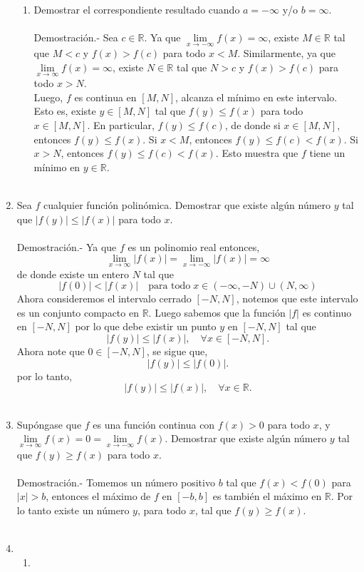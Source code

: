 \begin{enumerate}
\begin{enumerate}[\bfseries (a)]
	\item Demostrar el correspondiente resultado cuando $a=-\infty$ y/o $b=\infty$.\\\\
	    Demostración.-\; Sea $c\in \mathbb{R}$. Ya que $\lim\limits_{x\to -\infty}f(x) = \infty$, existe $M\in \mathbb{R}$ tal que $M<c$ y $f(x)>f(c)$ para todo $x<M.$ Similarmente, ya que $\lim\limits_{x\to \infty} f(x)=\infty$, existe $N\in \mathbb{R}$ tal que $N>c$ y $f(x)>f(c)$ para todo $x>N$.\\
	    Luego, $f$ es continua en $[M,N]$, alcanza el mínimo en este intervalo. Esto es, existe $y\in [M,N]$ tal que $f(y)\leq f(x)$ para todo $x\in [M,N]$. En particular, $f(y)\leq f(c)$, de donde si $x\in [M,N]$, entonces $f(y)\leq f(x).$ Si $x<M$, entonces $f(y)\leq f(c)<f(x).$ Si $x>N$, entonces $f(y)\leq f(c)<f(x).$ Esto muestra que $f$ tiene un mínimo en $y \in \mathbb{R}.$\\\\

    \end{enumerate}

\item Sea $f$ cualquier función polinómica. Demostrar que existe algún número $y$ tal que $|f(y)|\leq |f(x)|$ para todo $x$.\\\\
    Demostración.-\; Ya que $f$ es un polinomio real entonces,
    $$\lim_{x\to \infty} |f(x)|=\lim_{x\to -\infty}|f(x)|=\infty$$
    de donde existe un entero $N$ tal que 
    $$|f(0)|<|f(x)|\quad \mbox{para todo}\; x\in (-\infty,-N)\cup(N,\infty)$$
    Ahora consideremos el intervalo cerrado $[-N,N]$, notemos que este intervalo es un conjunto compacto en $\mathbb{R}$. Luego sabemos que la función $|f|$ es continuo en $[-N,N]$ por lo que debe existir un punto $y$ en $[-N,N]$ tal que 
    $$|f(y)|\leq |f(x)|,\quad \forall x\in [-N,N].$$
    Ahora note que $0 \in [-N,N]$, se sigue que,
    $$|f(y)|\leq |f(0)|.$$
    por lo tanto,
    $$|f(y)|\leq |f(x)|,\quad \forall x\in \mathbb{R}.$$\\

\item Supóngase que $f$ es una función continua con $f(x)>0$ para todo $x$, y $\lim\limits_{x\to \infty} f(x)=0 = \lim\limits_{x\to -\infty} f(x)$. Demostrar que existe algún número $y$ tal que $f(y)\geq f(x)$ para todo $x$.\\\\
    Demostración.-\; Tomemos un número positivo $b$ tal que $f(x)<f(0)$ para $|x|>b$, entonces el máximo de $f$ en $[-b,b]$ es también el máximo en $\mathbb{R}.$ Por lo tanto existe un número $y$, para todo $x$, tal que $f(y)\geq f(x).$\\\\

\item 
    \begin{enumerate}[\bfseries (a)]
	\item 
    \end{enumerate}
    

\end{enumerate}
